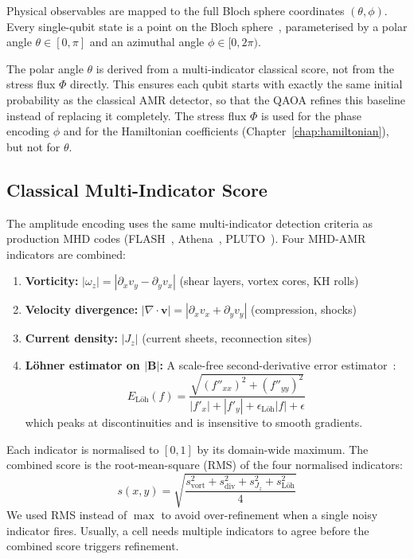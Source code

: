 \documentclass[12pt, a4paper, oneside]{report}
\begin{document}
Physical observables are mapped to the full Bloch sphere coordinates $(\theta, \phi)$. Every single-qubit state is a point on the Bloch sphere~\cite{nielsen2010}, parameterised by a polar angle $\theta \in [0, \pi]$ and an azimuthal angle $\phi \in [0, 2\pi)$.

The polar angle $\theta$ is derived from a multi-indicator classical score, not from the stress flux $\Phi$ directly. This ensures each qubit starts with exactly the same initial probability as the classical AMR detector, so that the QAOA refines this baseline instead of replacing it completely. The stress flux $\Phi$ is used for the phase encoding $\phi$ and for the Hamiltonian coefficients (Chapter~\ref{chap:hamiltonian}), but not for $\theta$.

\subsection{Classical Multi-Indicator Score}
\label{sec:classical-score}

The amplitude encoding uses the same multi-indicator detection criteria as production MHD codes (FLASH~\cite{fryxell2000}, Athena~\cite{stone2008}, PLUTO~\cite{mignone2007}). Four MHD-AMR indicators are combined:
\begin{enumerate}
    \item \textbf{Vorticity:} $|\omega_z| = |\partial_x v_y - \partial_y v_x|$ \quad (shear layers, vortex cores, KH rolls)
    \item \textbf{Velocity divergence:} $|\nabla \cdot \mathbf{v}| = |\partial_x v_x + \partial_y v_y|$ \quad (compression, shocks)
    \item \textbf{Current density:} $|J_z|$ \quad (current sheets, reconnection sites)
    \item \textbf{L\"ohner estimator on $|\mathbf{B}|$:} A scale-free second-derivative error estimator~\cite{lohner1987}:
    \begin{equation}
        E_{\text{L\"oh}}(f) = \frac{\sqrt{(f''_{xx})^2 + (f''_{yy})^2}}{|f'_x| + |f'_y| + \epsilon_{\text{L\"oh}} |f| + \epsilon}
    \end{equation}
    which peaks at discontinuities and is insensitive to smooth gradients.
\end{enumerate}
Each indicator is normalised to $[0, 1]$ by its domain-wide maximum. The combined score is the root-mean-square (RMS) of the four normalised indicators:
\begin{equation}
    s(x,y) = \sqrt{\frac{s_{\text{vort}}^2 + s_{\text{div}}^2 + s_{J_z}^2 + s_{\text{L\"oh}}^2}{4}}
    \label{eq:classical-score}
\end{equation}
We used RMS instead of $\max$ to avoid over-refinement when a single noisy indicator fires. Usually, a cell needs multiple indicators to agree before the combined score triggers refinement.
\end{document}
